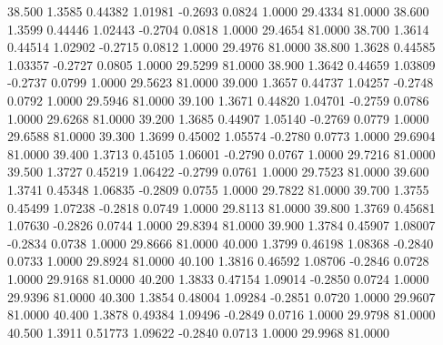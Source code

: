  38.500   1.3585   0.44382   1.01981  -0.2693   0.0824   1.0000  29.4334  81.0000
  38.600   1.3599   0.44446   1.02443  -0.2704   0.0818   1.0000  29.4654  81.0000
  38.700   1.3614   0.44514   1.02902  -0.2715   0.0812   1.0000  29.4976  81.0000
  38.800   1.3628   0.44585   1.03357  -0.2727   0.0805   1.0000  29.5299  81.0000
  38.900   1.3642   0.44659   1.03809  -0.2737   0.0799   1.0000  29.5623  81.0000
  39.000   1.3657   0.44737   1.04257  -0.2748   0.0792   1.0000  29.5946  81.0000
  39.100   1.3671   0.44820   1.04701  -0.2759   0.0786   1.0000  29.6268  81.0000
  39.200   1.3685   0.44907   1.05140  -0.2769   0.0779   1.0000  29.6588  81.0000
  39.300   1.3699   0.45002   1.05574  -0.2780   0.0773   1.0000  29.6904  81.0000
  39.400   1.3713   0.45105   1.06001  -0.2790   0.0767   1.0000  29.7216  81.0000
  39.500   1.3727   0.45219   1.06422  -0.2799   0.0761   1.0000  29.7523  81.0000
  39.600   1.3741   0.45348   1.06835  -0.2809   0.0755   1.0000  29.7822  81.0000
  39.700   1.3755   0.45499   1.07238  -0.2818   0.0749   1.0000  29.8113  81.0000
  39.800   1.3769   0.45681   1.07630  -0.2826   0.0744   1.0000  29.8394  81.0000
  39.900   1.3784   0.45907   1.08007  -0.2834   0.0738   1.0000  29.8666  81.0000
  40.000   1.3799   0.46198   1.08368  -0.2840   0.0733   1.0000  29.8924  81.0000
  40.100   1.3816   0.46592   1.08706  -0.2846   0.0728   1.0000  29.9168  81.0000
  40.200   1.3833   0.47154   1.09014  -0.2850   0.0724   1.0000  29.9396  81.0000
  40.300   1.3854   0.48004   1.09284  -0.2851   0.0720   1.0000  29.9607  81.0000
  40.400   1.3878   0.49384   1.09496  -0.2849   0.0716   1.0000  29.9798  81.0000
  40.500   1.3911   0.51773   1.09622  -0.2840   0.0713   1.0000  29.9968  81.0000
